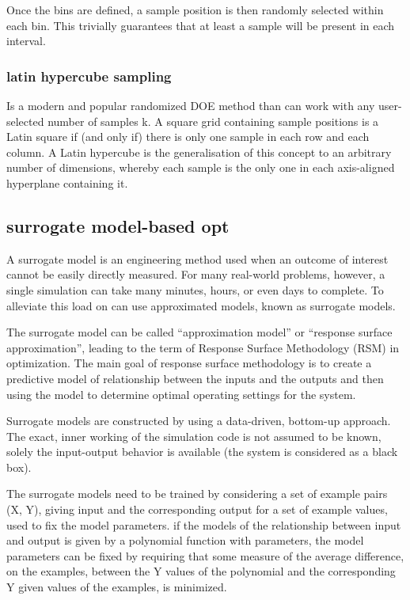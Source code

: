 \documentclass[10pt]{article}
\begin{document}
Once the bins are defined, a sample position is then randomly selected
within each bin. This trivially guarantees that at least a sample will be present in each interval.

\subsubsection{latin hypercube sampling}
Is a modern and popular randomized DOE method than can work with any user-selected number of samples k. A square grid containing sample positions is a Latin square if (and only if) there is only one sample in each row and each column. A Latin hypercube is the generalisation of this concept to an arbitrary number of dimensions, whereby each sample is the only one in each axis-aligned hyperplane containing it.

\subsection{surrogate model-based opt}

A surrogate model is an engineering method used when an outcome of interest cannot be easily directly measured. For many real-world problems, however, a single simulation can take many minutes, hours, or even days to complete. To alleviate this load on can use approximated models, known as surrogate models.

The surrogate model can be called “approximation model” or “response surface approximation”, leading to the term of Response
Surface Methodology (RSM) in optimization. The main goal of response surface methodology is to create a predictive model of relationship between the inputs and the outputs and then using the model to determine optimal operating settings for the system.

Surrogate models are constructed by using a data-driven, bottom-up
approach. The exact, inner working of the simulation code is not assumed to be known, solely the input-output behavior is available (the system is considered as a black box).

The surrogate models need to be trained by considering a set of example pairs (X, Y), giving input and the corresponding output for a set of example values, used to fix the model parameters.
if the models of the relationship between input and output is
given by a polynomial function with parameters, the model parameters can be fixed by requiring that some measure of the average difference, on the examples, between the Y values of the polynomial and the corresponding Y given values of the examples, is minimized.
\end{document}
